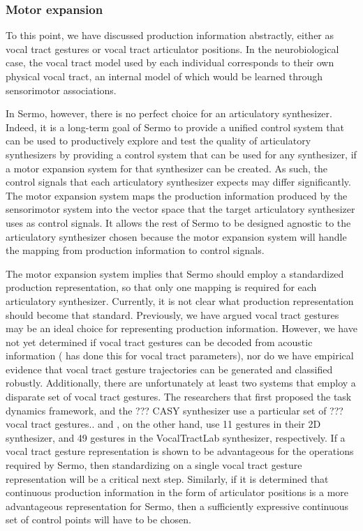 \subsubsection{Motor expansion}

To this point, we have discussed
production information abstractly,
either as vocal tract gestures
or vocal tract articulator positions.
In the neurobiological case,
the vocal tract model used
by each individual corresponds to
their own physical vocal tract,
an internal model of which
would be learned through
sensorimotor associations.

In Sermo, however,
there is no perfect choice
for an articulatory synthesizer.
Indeed, it is a long-term goal of Sermo
to provide a unified control system
that can be used to productively
explore and test the quality
of articulatory synthesizers
by providing a control system
that can be used for any synthesizer,
if a motor expansion system
for that synthesizer can be created.
As such, the control signals
that each articulatory synthesizer
expects may differ significantly.
The motor expansion system
maps the production information
produced by the sensorimotor system
into the vector space that
the target articulatory synthesizer
uses as control signals.
It allows the rest of Sermo
to be designed agnostic
to the articulatory synthesizer chosen
because the motor expansion system
will handle the mapping
from production information
to control signals.

The motor expansion system implies
that Sermo should employ
a standardized production representation,
so that only one mapping is required
for each articulatory synthesizer.
Currently, it is not clear
what production representation
should become that standard.
Previously, we have argued
vocal tract gestures may be an
ideal choice for representing production information.
However, we have not yet determined
if vocal tract gestures can be decoded
from acoustic information
(\citealt{uria2011} has done this for vocal tract parameters),
nor do we have empirical evidence
that vocal tract gesture trajectories
can be generated and classified robustly.
Additionally, there are unfortunately
at least two systems that employ
a disparate set of vocal tract gestures.
The researchers that first proposed
the task dynamics framework,
and the ??? CASY synthesizer
use a particular set of ??? vocal tract gestures..
\citet{kroger2014} and \citet{birkholz2006,birkholz2013},
on the other hand,
use 11 gestures in their 2D synthesizer,
and 49 gestures in the VocalTractLab synthesizer,
respectively.
If a vocal tract gesture representation
is shown to be advantageous
for the operations required by Sermo,
then standardizing on a single
vocal tract gesture representation
will be a critical next step.
Similarly,
if it is determined that
continuous production information
in the form of articulator positions
is a more advantageous representation
for Sermo,
then a sufficiently expressive
continuous set of control points
will have to be chosen.


